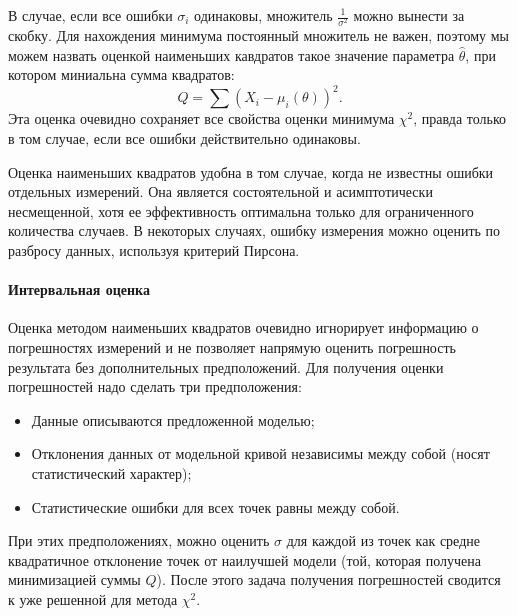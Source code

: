     В случае, если все ошибки $\sigma_i$ одинаковы, множитель
$\frac{1}{\sigma^2}$ можно вынести за скобку. Для нахождения минимума
постоянный множитель не важен, поэтому мы можем назвать оценкой
наименьших кавдратов такое значение параметра $\hat\theta$, при
котором миниальна сумма квадратов:
\begin{equation}
  Q = \sum{(X_i - \mu_i(\theta))^2}.
\end{equation}
Эта оценка очевидно сохраняет все свойства оценки
минимума $\chi^2$, правда только в том случае, если все ошибки
действительно одинаковы.

Оценка наименьших квадратов удобна в том случае, когда не известны
ошибки отдельных измерений. Она является состоятельной и асимптотически
несмещенной, хотя ее эффективность оптимальна только для ограниченного
количества случаев. В некоторых случаях, ошибку измерения можно оценить
по разбросу данных, используя критерий Пирсона.

\paragraph{Интервальная оценка}

Оценка методом наименьших квадратов очевидно игнорирует информацию о
погрешностях измерений и не позволяет напрямую оценить погрешность
результата без дополнительных предположений. Для получения оценки
погрешностей надо сделать три предположения:

\begin{itemize}
    \item  Данные описываются предложенной моделью;
    \item  Отклонения данных от модельной кривой независимы между собой (носят
  статистический характер);
    \item  Статистические ошибки для всех точек равны между собой.
\end{itemize}

При этих предположениях, можно оценить $\sigma$ для каждой из точек
как средне квадратичное отклонение точек от наилучшей модели (той,
которая получена минимизацией суммы $Q$). После этого задача получения
погрешностей сводится к уже решенной для метода $\chi^2$.


